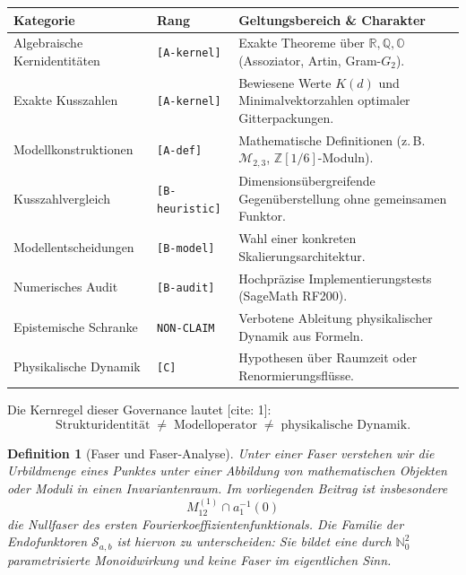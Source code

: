 \documentclass[11pt,a4paper]{article}
\newtheorem{definition}[theorem]{Definition}
\begin{document}
	\begin{table}[h!]
		\centering
		\begin{tabularx}{\textwidth}{@{}p{}p{}X@{}}
			\toprule
			\textbf{Kategorie} & \textbf{Rang} & \textbf{Geltungsbereich \& Charakter} \\
			\midrule
			Algebraische Kernidentitäten & \texttt{[A-kernel]} & Exakte Theoreme über $\mathbb{R}, \mathbb{Q}, \mathbb{O}$ (Assoziator, Artin, Gram-$G_2$). \\
			Exakte Kusszahlen & \texttt{[A-kernel]} & Bewiesene Werte $K(d)$ und Minimalvektorzahlen optimaler Gitterpackungen. \\
			Modellkonstruktionen & \texttt{[A-def]} & Mathematische Definitionen (z.\,B.\ $\mathcal{M}_{2,3}$, $\mathbb{Z}[1/6]$-Moduln). \\
			Kusszahlvergleich & \texttt{[B-heuristic]} & Dimensionsübergreifende Gegenüberstellung ohne gemeinsamen Funktor. \\
			Modellentscheidungen & \texttt{[B-model]} & Wahl einer konkreten Skalierungsarchitektur. \\
			Numerisches Audit & \texttt{[B-audit]} & Hochpräzise Implementierungstests (SageMath RF200). \\
			Epistemische Schranke & \texttt{NON-CLAIM} & Verbotene Ableitung physikalischer Dynamik aus Formeln. \\
			Physikalische Dynamik & \texttt{[C]} & Hypothesen über Raumzeit oder Renormierungsflüsse. \\
			\bottomrule
		\end{tabularx}
	\end{table}
	
	Die Kernregel dieser Governance lautet \cite{eabcAudit}[cite: 1]:
	\begin{equation}
		\text{Strukturidentität} \;\neq\; \text{Modelloperator} \;\neq\; \text{physikalische Dynamik}.
	\end{equation}
	
	\begin{definition}[Faser und Faser-Analyse]
		Unter einer \emph{Faser} verstehen wir die Urbildmenge eines Punktes unter einer Abbildung von mathematischen Objekten oder Moduli in einen Invariantenraum. Im vorliegenden Beitrag ist insbesondere
		\begin{equation}
			M_{12}^{(1)} \cap a_1^{-1}(0)
		\end{equation}
		die Nullfaser des ersten Fourierkoeffizientenfunktionals. Die Familie der Endofunktoren $\mathscr{S}_{a,b}$ ist hiervon zu unterscheiden: Sie bildet eine durch $\mathbb{N}_0^2$ parametrisierte Monoidwirkung und keine Faser im eigentlichen Sinn.
	\end{definition}
	
\end{document}
